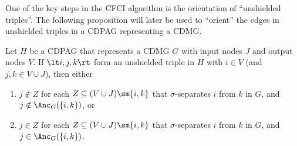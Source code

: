 One of the key steps in the CFCI algorithm is the orientation of ``unshielded triples''.
The following proposition will later be used to ``orient'' the edges in unshielded triples in a CDPAG representing a CDMG.
\begin{Prp}\label{prp:orienting_unshielded_triples}
  Let $H$ be a CDPAG that represents a CDMG $G$ with input nodes $J$ and output nodes $V$.
  If $\lt i, j, k \rt$ form an unshielded triple in $H$ with $i \in V$ (and $j,k \in V \cup J$), then either 
  \begin{enumerate}[label=(\roman*)]
    \item $j \notin Z$ for each $Z \subseteq (V \cup J) \sm \{i,k\}$ that $\sigma$-separates $i$ from $k$ in $G$, and $j \notin \Anc_G(\{i,k\})$, or
    \item $j \in Z$ for each $Z \subseteq (V \cup J) \sm \{i,k\}$ that $\sigma$-separates $i$ from $k$ in $G$, and $j \in \Anc_G(\{i,k\})$.
  \end{enumerate}
\end{Prp}
